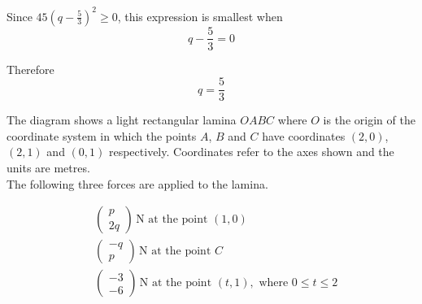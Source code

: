 \documentclass[leqno]{article}
\begin{document}
\begin{enumerate}[
  label=\textbf{\arabic*.},
  leftmargin=*,
  topsep=0pt,
  partopsep=0pt,
  parsep=0pt
]
\begin{djsSolution}
Since \(45\left(q-\frac{5}{3}\right)^2\ge 0\), this expression is smallest when
\[
q-\frac{5}{3}=0
\]

Therefore
\[
q=\frac{5}{3}
\]
\end{djsSolution}


\newpage

\questionitem

\begin{figure}[H]
    \centering
{}
\end{figure}


The diagram shows a light rectangular lamina $OABC$ where $O$ is the origin of the coordinate system in which the points $A$, $B$ and $C$ have coordinates $(2, 0)$, $(2, 1)$ and $(0, 1)$ respectively. Coordinates refer to the axes shown and the units are metres. \\

The following three forces are applied to the lamina. 

\begin{align*}
&\begin{pmatrix}
p \\
2q
\end{pmatrix}\,\mathrm{N} \text{ at the point } (1, 0) \\[1em]
&\begin{pmatrix}
-q \\
p
\end{pmatrix}\,\mathrm{N} \text{ at the point } C \\[1em]
&\begin{pmatrix}
-3 \\
-6
\end{pmatrix}\,\mathrm{N} \text{ at the point } (t, 1), \text{ where } 0 \le t \le 2 \\
\end{align*}


\end{enumerate}
\end{document}
